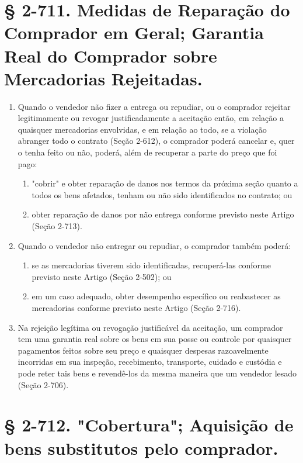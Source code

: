 \documentclass[a5paper,10pt]{book}
\begin{document}
\section{§ 2-711. Medidas de Reparação do Comprador em Geral; Garantia Real do Comprador sobre Mercadorias Rejeitadas.}

\begin{enumerate}[label=(\arabic*)]
	\item Quando o vendedor não fizer a entrega ou repudiar, ou o comprador rejeitar legitimamente ou revogar justificadamente a aceitação então, em relação a quaisquer mercadorias envolvidas, e em relação ao todo, se a violação abranger todo o contrato (Seção 2-612), o comprador poderá cancelar e, quer o tenha feito ou não, poderá, além de recuperar a parte do preço que foi pago:
	\begin{enumerate}
		\item "cobrir" e obter reparação de danos nos termos da próxima seção quanto a todos os bens afetados, tenham ou não sido identificados no contrato; ou
		\item obter reparação de danos por não entrega conforme previsto neste Artigo (Seção 2-713).
	\end{enumerate}
	\item Quando o vendedor não entregar ou repudiar, o comprador também poderá:
	\begin{enumerate}
		\item se as mercadorias tiverem sido identificadas, recuperá-las conforme previsto neste Artigo (Seção 2-502); ou
		\item em um caso adequado, obter desempenho específico ou reabastecer as mercadorias conforme previsto neste Artigo (Seção 2-716).
	\end{enumerate}
	\item Na rejeição legítima ou revogação justificável da aceitação, um comprador tem uma garantia real sobre os bens em sua posse ou controle por quaisquer pagamentos feitos sobre seu preço e quaisquer despesas razoavelmente incorridas em sua inspeção, recebimento, transporte, cuidado e custódia e pode reter tais bens e revendê-los da mesma maneira que um vendedor lesado (Seção 2-706).
\end{enumerate}

\section{§ 2-712. "Cobertura"; Aquisição de bens substitutos pelo comprador.}
\end{document}
